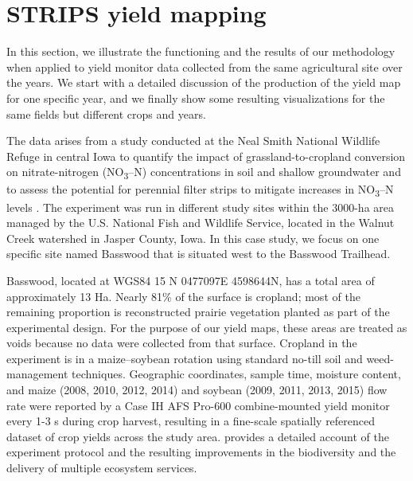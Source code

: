 \section{STRIPS yield mapping}

 In this section, we illustrate the
functioning and the results of our methodology when applied to yield
monitor data collected from the same agricultural site over the
years. We start with a detailed discussion of the production of the
yield map for one specific year, and we finally show some resulting
visualizations for the same fields but different crops and years.

 The data arises from a study
conducted at the Neal Smith National Wildlife Refuge in central Iowa
to quantify the impact of grassland-to-cropland conversion on
nitrate-nitrogen (NO\textsubscript{3}–N) concentrations in soil and
shallow groundwater and to assess the potential for perennial filter
strips to mitigate increases in NO\textsubscript{3}–N levels
\citep{Zhou2010}. The experiment was run in different study sites
within the 3000-ha area managed by the U.S. National Fish and Wildlife
Service, located in the Walnut Creek watershed in Jasper County,
Iowa. In this case study, we focus on one specific site named Basswood
that is situated west to the Basswood Trailhead.

 Basswood, located at WGS84 15 N
0477097E 4598644N, has a total area of approximately 13 Ha. Nearly
81\% of the surface is cropland; most of the remaining proportion is
reconstructed prairie vegetation planted as part of the experimental
design. For the purpose of our yield maps, these areas are treated as
voids because no data were collected from that surface. Cropland in the
experiment is in a maize–soybean rotation using standard no-till soil
and weed-management techniques. Geographic coordinates, sample time,
moisture content, and maize (2008, 2010, 2012, 2014) and soybean (2009,
2011, 2013, 2015) flow rate were reported by a Case IH AFS Pro-600
combine-mounted yield monitor every 1-3 s during crop harvest,
resulting in a fine-scale spatially referenced dataset of crop yields
across the study area. \cite{Schulte2017} provides a detailed account
of the experiment protocol and the resulting improvements in the
biodiversity and the delivery of multiple ecosystem services.

